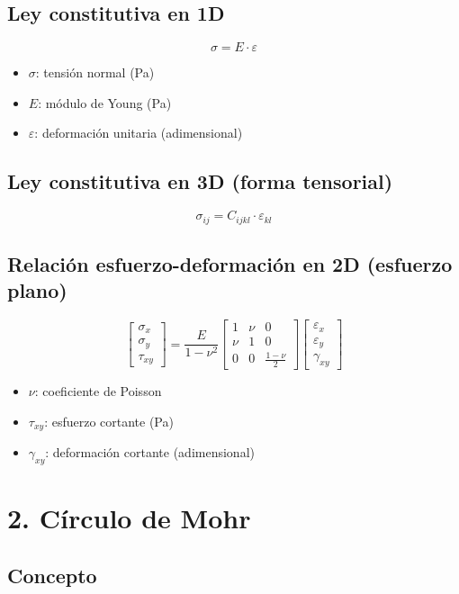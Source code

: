 \documentclass{article} %
\begin{document}
\subsection*{Ley constitutiva en 1D}
\[
\sigma = E \cdot \varepsilon
\]
\begin{itemize}
    \item $\sigma$: tensión normal (Pa)
    \item $E$: módulo de Young (Pa)
    \item $\varepsilon$: deformación unitaria (adimensional)
\end{itemize}

\subsection*{Ley constitutiva en 3D (forma tensorial)}
\[
\sigma_{ij} = C_{ijkl} \cdot \varepsilon_{kl}
\]

\subsection*{Relación esfuerzo-deformación en 2D (esfuerzo plano)}
\[
\begin{bmatrix}
\sigma_x \\
\sigma_y \\
\tau_{xy}
\end{bmatrix}
=
\frac{E}{1 - \nu^2}
\begin{bmatrix}
1 & \nu & 0 \\
\nu & 1 & 0 \\
0 & 0 & \frac{1 - \nu}{2}
\end{bmatrix}
\begin{bmatrix}
\varepsilon_x \\
\varepsilon_y \\
\gamma_{xy}
\end{bmatrix}
\]
\begin{itemize}
    \item $\nu$: coeficiente de Poisson
    \item $\tau_{xy}$: esfuerzo cortante (Pa)
    \item $\gamma_{xy}$: deformación cortante (adimensional)
\end{itemize}
\newpage
\section*{2. Círculo de Mohr}

\subsection*{Concepto}
\end{document}
